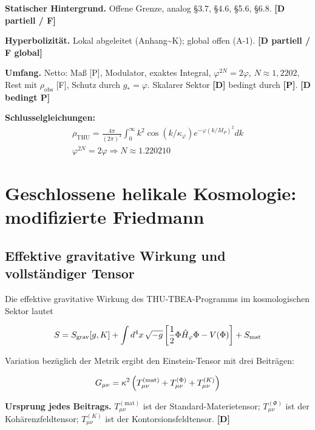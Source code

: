 ﻿\documentclass[11pt,letterpaper]{article}
\begin{document}
\textbf{Statischer Hintergrund.} Offene Grenze, analog §3.7, §4.6, §5.6, §6.8. \textbf{[D partiell / F]}

\textbf{Hyperbolizität.} Lokal abgeleitet (Anhang\textasciitilde{}K); global offen (A-1). \textbf{[D partiell / F global]}

\textbf{Umfang.} Netto: Maß [P], Modulator, exaktes Integral, $\varphi^{2N} = 2\varphi$, $N \approx 1{,}2202$, Rest mit $\rho_{\text{obs}}$ [F], Schutz durch $g_* = \varphi$. Skalarer Sektor \textbf{[D]} bedingt durch \textbf{[P]}. \textbf{[D bedingt P]}

\textbf{Schlusselgleichungen:}
\begin{align*}
    \rho_{\mathrm{THU}} = \frac{4\pi}{(2\pi)^3}\int_0^\infty k^2 \cos(k/\kappa_\varphi) e^{-\varphi(k/M_P)^2} dk \\
    \varphi^{2N} = 2\varphi \Rightarrow N \approx 1.220210
\end{align*}
\section{Geschlossene helikale Kosmologie: modifizierte Friedmann}
\subsection{Effektive gravitative Wirkung und vollständiger Tensor}
Die effektive gravitative Wirkung des THU-TBEA-Programms im kosmologischen Sektor lautet

\begin{equation*}
  \resizebox{\ifdim\width>\linewidth \linewidth\else\width\fi}{!}{$\displaystyle S = S_{\text{grav}}[g, K] + \int d^4x\,\sqrt{-g}\left[\frac{1}{2}\Phi\hat{H}_\varphi\Phi - V(\Phi)\right] + S_{\text{mat}}$}
\end{equation*}

Variation bezüglich der Metrik ergibt den Einstein-Tensor mit drei Beiträgen:

\begin{equation*}
  \resizebox{\ifdim\width>\linewidth \linewidth\else\width\fi}{!}{$\displaystyle G_{\mu\nu} = \kappa^2\left(T_{\mu\nu}^{(\text{mat})} + T_{\mu\nu}^{(\Phi)} + T_{\mu\nu}^{(K)}\right)$}
\end{equation*}

\textbf{Ursprung jedes Beitrags.} $T_{\mu\nu}^{(\text{mat})}$ ist der Standard-Materietensor; $T_{\mu\nu}^{(\Phi)}$ ist der Kohärenzfeldtensor; $T_{\mu\nu}^{(K)}$ ist der Kontorsionsfeldtensor. \textbf{[D]}
\end{document}
